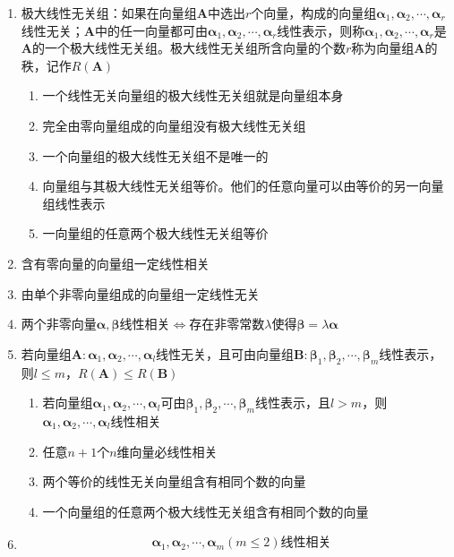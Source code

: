 \documentclass[12pt]{book}
\begin{document}
\begin{enumerate}[1.]
    \item 极大线性无关组：如果在向量组$\bm{A}$中选出$r$个向量，构成的向量组$\bm{\alpha}_1,\bm{\alpha}_2,\cdots,\bm{\alpha}_r$线性无关；$\bm{A}$中的任一向量都可由$\bm{\alpha}_1,\bm{\alpha}_2,\cdots,\bm{\alpha}_r$线性表示，则称$\bm{\alpha}_1,\bm{\alpha}_2,\cdots,\bm{\alpha}_r$是$\bm{A}$的一个极大线性无关组。极大线性无关组所含向量的个数$r$称为向量组$\bm{A}$的秩，记作$R(\bm{A})$
    \begin{enumerate}[(1)]
        \item 一个线性无关向量组的极大线性无关组就是向量组本身
        \item 完全由零向量组成的向量组没有极大线性无关组
        \item 一个向量组的极大线性无关组不是唯一的
        \item 向量组与其极大线性无关组等价。他们的任意向量可以由等价的另一向量组线性表示
        \item 一向量组的任意两个极大线性无关组等价
    \end{enumerate}
    \item 含有零向量的向量组一定线性相关
    \item 由单个非零向量组成的向量组一定线性无关
    \item 两个非零向量$\bm{\alpha},\bm{\beta}$线性相关$\Leftrightarrow$存在非零常数$\lambda$使得$\bm{\beta}=\lambda\bm{\alpha}$
    \item 若向量组$\bm{A}:\bm{\alpha}_1,\bm{\alpha}_2,\cdots,\bm{\alpha}_{l}$线性无关，且可由向量组$\bm{B}:\bm{\beta}_1,\bm{\beta}_2,\cdots,\bm{\beta}_m$线性表示，则$l\leqslant m$，$R(\bm{A})\leqslant R(\bm{B})$
    \begin{enumerate}
        \item 若向量组$\bm{\alpha}_1,\bm{\alpha}_2,\cdots,\bm{\alpha}_{l}$可由$\bm{\beta}_1,\bm{\beta}_2,\cdots,\bm{\beta}_m$线性表示，且$l>m$，则$\bm{\alpha}_1,\bm{\alpha}_2,\cdots,\bm{\alpha}_{l}$线性相关 
        \item 任意$n+1$个$n$维向量必线性相关
        \item 两个等价的线性无关向量组含有相同个数的向量
        \item 一个向量组的任意两个极大线性无关组含有相同个数的向量
    \end{enumerate}
    \item
          \begin{align*}
                              & \bm{\alpha}_1,\bm{\alpha}_2,\cdots,\bm{\alpha}_{m} (m\leqslant 2)\text{线性相关}                         \\

\end{align*}
\end{enumerate}
\end{document}
